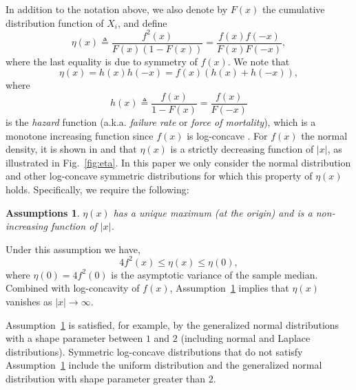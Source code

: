 \documentclass[letterpaper, 11pt]{IEEEtran}      %
\newtheorem{assump}{\bf {Assumptions}}
\begin{document}
In addition to the notation above, we also denote by $F(x)$ the cumulative distribution function of $X_i$, and define
\begin{equation} \label{eq:eta_def}
\eta(x) \triangleq \frac{f^2(x)}{F(x)(1-F(x))} =  \frac{f(x)f(-x)}{F(x)F(-x)}, 
\end{equation}
where the last equality is due to symmetry of $f(x)$. We note that 
\begin{equation}
\label{eq:eta_h}
\eta(x) = h(x)h(-x) = f(x) \left( h(x) + h(-x) \right), 
\end{equation}
where 
\[
h(x) \triangleq \frac{f(x)}{1-F(x)} = \frac{f(x)}{F(-x)}
\]
is the \emph{hazard} function (a.k.a. \emph{failure rate} or \emph{force of mortality}), which is a monotone increasing function since $f(x)$ is log-concave \cite{bagnoli2005log}. 
%
For $f(x)$ the normal density, it is shown in \cite{Samford1953} and \cite{hammersley1950estimating} that $\eta(x)$ is a strictly decreasing function of $|x|$, as illustrated in Fig.~\ref{fig:eta}. 
%
In this paper we only consider the normal distribution and other log-concave symmetric distributions for which this property of $\eta(x)$ holds. Specifically, we require the following:
\begin{assump} \label{assump:failure_rate}
 $\eta(x)$ has a unique maximum (at the origin) and is a non-increasing function of $|x|$. 
\end{assump}
Under this assumption we have, 
\[
4f^2(x) \leq \eta(x) \leq \eta(0),
\] 
%
where $\eta(0) = 4 f^2(0)$ is the asymptotic variance of the sample median. Combined with log-concavity of $f(x)$, Assumption~\ref{assump:failure_rate} implies that $\eta(x)$ vanishes as $|x|\rightarrow \infty$. \par
%
Assumption~\ref{assump:failure_rate} is satisfied, for example, by the generalized normal distributions with a shape parameter between $1$ and $2$ (including normal and Laplace distributions). Symmetric log-concave distributions that do not satisfy Assumption~\ref{assump:failure_rate} include the uniform distribution and the generalized normal distribution with shape parameter greater than $2$.
\\
\end{document}
